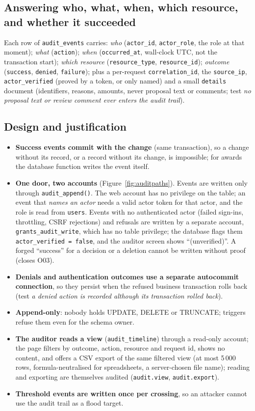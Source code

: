 \documentclass[10pt,a4paper]{article}
\newcommand{\code}[1]{\nolinkurl{#1}}
\begin{document}
\subsection{Answering who, what, when, which resource, and whether it succeeded}
Each row of \code{audit_events} carries: \emph{who} (\code{actor_id}, \code{actor_role}, the role at that moment); \emph{what} (\code{action}); \emph{when} (\code{occurred_at}, wall-clock UTC, not the transaction start); \emph{which resource} (\code{resource_type}, \code{resource_id}); \emph{outcome} (\code{success}, \code{denied}, \code{failure}); plus a per-request \code{correlation_id}, the \code{source_ip}, \code{actor\_verified} (proved by a token, or only named) and a small \code{details} document (identifiers, reasons, amounts, never proposal text or comments; test \emph{no proposal text or review comment ever enters the audit trail}).

\subsection{Design and justification}
\begin{itemize}
\item \textbf{Success events commit with the change} (same transaction), so a change without its record, or a record without its change, is impossible; for awards the database function writes the event itself.
\item \textbf{One door, two accounts} (Figure~\ref{fig:auditpaths}). Events are written only through \code{audit\_append()}. The web account has no privilege on the table; an event that \emph{names an actor} needs a valid actor token for that actor, and the role is read from \code{users}. Events with no authenticated actor (failed sign-ins, throttling, CSRF rejections) and refusals are written by a separate account, \code{grants_audit_write}, which has no table privilege; the database flags them \code{actor\_verified = false}, and the auditor screen shows ``(unverified)''. A forged ``success'' for a decision or a deletion cannot be written without proof (closes O03).
\item \textbf{Denials and authentication outcomes use a separate autocommit connection}, so they persist when the refused business transaction rolls back (test \emph{a denied action is recorded although its transaction rolled back}).
\item \textbf{Append-only}: nobody holds UPDATE, DELETE or TRUNCATE; triggers refuse them even for the schema owner.
\item \textbf{The auditor reads a view} (\code{audit_timeline}) through a read-only account; the page filters by outcome, action, resource and request id, shows no content, and offers a CSV export of the same filtered view (at most 5\,000 rows, formula-neutralised for spreadsheets, a server-chosen file name); reading and exporting are themselves audited (\code{audit.view}, \code{audit.export}).
\item \textbf{Threshold events are written once per crossing}, so an attacker cannot use the audit trail as a flood target.
\end{itemize}
\end{document}
